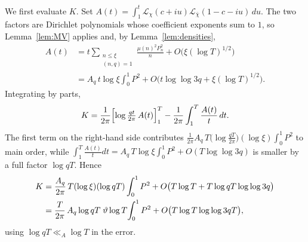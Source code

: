 \documentclass[12pt,a4paper,reqno]{amsart}
\theoremstyle{remark}
\numberwithin{equation}{section}
\begin{document}
We first evaluate $K$. Set $A(t)=\int_1^t\mathcal{L}_\chi(c+iu)\mathcal{L}_{\bar\chi}(1-c-iu)\,du$. The two factors are Dirichlet polynomials whose coefficient exponents sum to $1$, so Lemma~\ref{lem:MV} applies and, by Lemma~\ref{lem:densities},
\[
\begin{aligned}
A(t)&=t\sum_{\substack{n\le\xi\\(n,q)=1}}\frac{\mu(n)^2P_n^2}{n}+O\bigl(\xi(\log T)^{1/2}\bigr)\\
&=A_q\,t\log\xi\int_0^1 P^2+O\bigl(t\log\log 3q+\xi(\log T)^{1/2}\bigr).
\end{aligned}
\]
Integrating by parts,
\[
K=\frac{1}{2\pi}\Bigl[\log\tfrac{qt}{2\pi}\,A(t)\Bigr]_1^T-\frac{1}{2\pi}\int_1^T\frac{A(t)}{t}\,dt.
\]
The first term on the right-hand side contributes $\frac{1}{2\pi}A_q\,T\bigl(\log\tfrac{qT}{2\pi}\bigr)(\log\xi)\int_0^1 P^2$ to main order, while $\int_1^T\frac{A(t)}{t}dt=A_q\,T\log\xi\int_0^1 P^2+O(T\log\log 3q)$ is smaller by a full factor $\log qT$. Hence
\begin{align}
K&=\frac{A_q}{2\pi}\,T(\log\xi)(\log qT)\int_0^1 P^2+O\bigl(T\log T+T\log qT\log\log 3q\bigr)\notag\\
&=\frac{T}{2\pi}\,A_q\log qT\;\vartheta\log T\!\int_0^1 P^2+O\bigl(T\log T\log\log 3qT\bigr),\label{eq:K-MN}
\end{align}
using $\log qT\ll_A\log T$ in the error.
\end{document}
